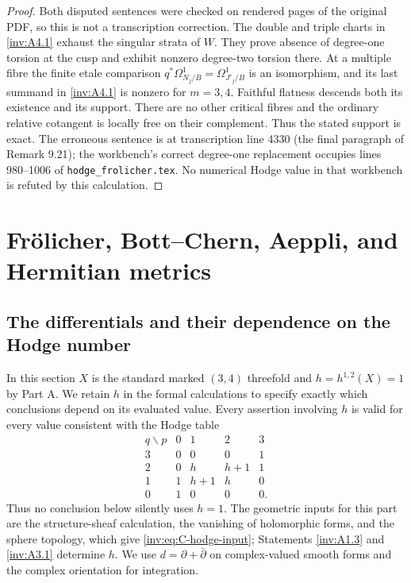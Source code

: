 \begin{proof}
Both disputed sentences were checked on rendered pages of the
original PDF, so this is not a transcription correction.  The
double and triple charts in \ref{inv:A4.1} exhaust the singular strata of
$W$.  They prove absence of degree-one torsion at the cusp and
exhibit nonzero degree-two torsion there.  At a multiple fibre the
finite etale comparison
$q^*\Omega^1_{N_j/B}=\Omega^1_{J'_j/B}$ is an isomorphism,
and its last summand in \ref{inv:A4.1} is nonzero for $m=3,4$.
Faithful flatness descends both its existence and its support.
There are no other critical fibres and the ordinary relative
cotangent is locally free on their complement.  Thus the stated
support is exact.  The erroneous sentence is at transcription
line 4330 (the final paragraph of Remark 9.21); the workbench's
correct degree-one replacement occupies lines 980--1006 of
\texttt{hodge\_frolicher.tex}.  No numerical Hodge value in that
workbench is refuted by this calculation.
\end{proof}



\section{Fr\"olicher, Bott--Chern, Aeppli, and Hermitian metrics}
\label{inv:sec:partC}

\subsection{The differentials and their dependence on the Hodge number}

In this section $X$ is the standard marked $(3,4)$ threefold and
$h=h^{1,2}(X)=1$ by Part A.  We retain $h$ in the formal calculations
to specify exactly which conclusions depend on its evaluated value.
Every assertion involving $h$ is valid for every value
consistent with the Hodge table
\begin{equation}\label{inv:eq:C-hodge-input}
\begin{array}{c|rrrr}
q\backslash p&0&1&2&3\\\hline
3&0&0&0&1\\
2&0&h&h+1&1\\
1&1&h+1&h&0\\
0&1&0&0&0.
\end{array}
\end{equation}
Thus no conclusion below silently uses $h=1$.  The geometric inputs for
this part are the structure-sheaf calculation, the vanishing of
holomorphic forms, and the sphere topology, which give
\eqref{inv:eq:C-hodge-input}; Statements \ref{inv:A1.3} and \ref{inv:A3.1} determine $h$.
We use $d=\partial+\bar\partial$ on complex-valued
smooth forms and the complex orientation for integration.

